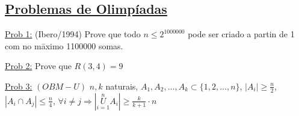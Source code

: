 \documentclass[a4paper,12pt]{article}
\renewcommand{\leq}{\ensuremath{\leqslant}}
\renewcommand{\geq}{\ensuremath{\geqslant}}
\theoremstyle{plain} %
\theoremstyle{definition} %
\theoremstyle{remark} %
\begin{document}
	\newpage
	\subsection*{\vspace{2ex}\underline{Problemas de Olimp\'iadas}}
	
	\vspace{1ex}\underline{Prob 1:} (Ibero/1994) Prove que todo $n\leq 2^{1000000}$ pode ser criado a partin de 1 com no m\=aximo 1100000 somas.
	
	\vspace{2ex}\underline{Prob 2:} Prove que $R(3,4)=9$
	
	\vspace{2ex}\underline{Prob 3:} $(OBM-U)$ $n,k$ naturais, $A_1, A_2,\dotso,A_k\subset \{1,2,\dotso,n\}$, $|A_i|\geq \frac{n}{2}$, $|A_i\cap A_j|\leq \frac{n}{4}$, $\forall i\neq j \Rightarrow |\overset{n}{\underset{i=1}{U}} A_i|\geq \frac{k}{k+1}\cdot n$
	
\end{document}
